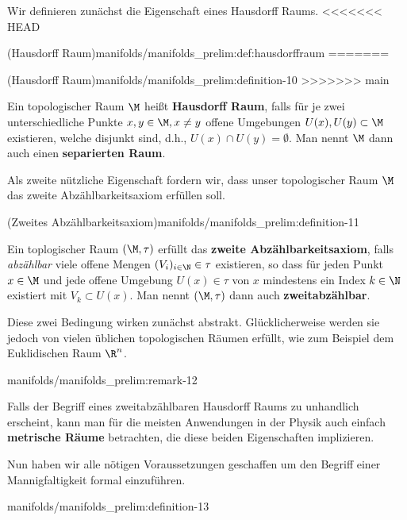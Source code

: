 \documentclass[letterpaper,10pt,english]{jupyterBook}
\begin{document}
\par
Wir definieren zunächst die Eigenschaft eines Hausdorff Raums.
<<<<<<< HEAD
\begin{definition}{(Hausdorff Raum)}{manifolds/manifolds_prelim:def:hausdorffraum}
=======
\begin{definition}{(Hausdorff Raum)}{manifolds/manifolds_prelim:definition-10}
>>>>>>> main



\par
Ein topologischer Raum \(\M\) heißt \textbf{Hausdorff Raum}, falls für je zwei unterschiedliche Punkte \(x,y\in \M, x\neq y\) offene Umgebungen \(U(x), U(y) \subset \M\) existieren, welche disjunkt sind, d.h., \(U(x)\cap U(y) = \emptyset\).
Man nennt \(\M\) dann auch einen \textbf{separierten Raum}.
\end{definition}

\par
Als zweite nützliche Eigenschaft fordern wir, dass unser topologischer Raum \(\M\) das zweite Abzählbarkeitsaxiom erfüllen soll.
\begin{definition}{(Zweites Abzählbarkeitsaxiom)}{manifolds/manifolds_prelim:definition-11}



\par
Ein toplogischer Raum \((\M, \tau)\) erfüllt das \textbf{zweite Abzählbarkeitsaxiom}, falls \emph{abzählbar} viele offene Mengen \((V_i)_{i\in\N} \in \tau\) existieren, so dass für jeden Punkt \(x\in \M\) und jede offene Umgebung \(U(x) \in \tau\) von \(x\) mindestens ein Index \(k\in\N\) existiert mit \(V_k \subset U(x)\).
Man nennt \((\M, \tau)\) dann auch \textbf{zweitabzählbar}.
\end{definition}

\par
Diese zwei Bedingung wirken zunächst abstrakt.
Glücklicherweise werden sie jedoch von vielen üblichen topologischen Räumen erfüllt, wie zum Beispiel dem Euklidischen Raum \(\R^n\).
\begin{remark}{}{manifolds/manifolds_prelim:remark-12}



\par
Falls der Begriff eines zweitabzählbaren Hausdorff Raums zu unhandlich erscheint, kann man für die meisten Anwendungen in der Physik auch einfach \textbf{metrische Räume} betrachten, die diese beiden Eigenschaften implizieren.
\end{remark}

\par
Nun haben wir alle nötigen Voraussetzungen geschaffen um den Begriff einer Mannigfaltigkeit formal einzuführen.
\begin{definition}{}{manifolds/manifolds_prelim:definition-13}




\end{definition}
\end{definition}
\end{document}
